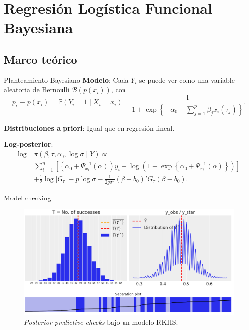 \documentclass[10pt, spanish, professionalfonts]{beamer}
\begin{document}
\section{Regresión Logística Funcional Bayesiana}

\subsection{Marco teórico}

\begin{frame}{Planteamiento Bayesiano}
\textbf{Modelo}: Cada \(Y_i\) se puede ver como una variable aleatoria de Bernoulli \(\mathcal B(p(x_i))\), con
\[
p_i \equiv p(x_i)=\mathbb P(Y_i=1\mid X_i=x_i) = \frac{1}{1 + \exp\left\{-\alpha_0-\displaystyle\sum_{j=1}^p \beta_jx_i(\tau_j)\right\}}.
\]

\textbf{Distribuciones a priori}: Igual que en regresión lineal.

\textbf{Log-posterior}:
\begin{align*}
  \log \ &\pi(\beta, \tau, \alpha_0, \log\sigma\mid Y) \propto\\
   &\sum_{i=1}^n \left[ \left(\alpha_0 + \Psi^{-1}_{x_i}(\alpha)\right)y_i - \log\left(1 + \exp\left\{\alpha_0 + \Psi_{x_i}^{-1}(\alpha)\right\}\right)\right]\\
   &+
\frac{1}{2}\log |G_\tau| - p\log \sigma -\frac{1}{2g\sigma^2} (\beta - b_0)'G_\tau(\beta - b_0).
\end{align*}
\end{frame}

\begin{frame}{Model checking}
  \begin{figure}
    \includegraphics[width=\textwidth]{img/ppc_log}
    \caption{\textit{Posterior predictive checks} bajo un modelo RKHS.}
  \end{figure}
\end{frame}
\end{document}
